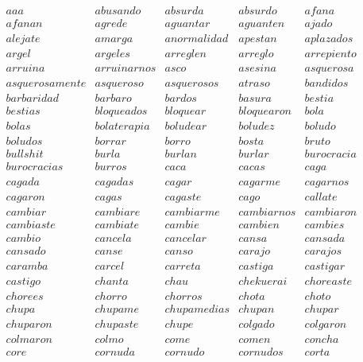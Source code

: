\noindent
$
\begin{array}{ccccc}
aaa & abusando & absurda & absurdo & afana \\
afanan & agrede & aguantar & aguanten & ajado \\
alejate & amarga & anormalidad & apestan & aplazados \\
argel & argeles & arreglen & arreglo & arrepiento \\
arruina & arruinarnos & asco & asesina & asquerosa \\
asquerosamente & asqueroso & asquerosos & atraso & bandidos \\
barbaridad & barbaro & bardos & basura & bestia \\
bestias & bloqueados & bloquear & bloquearon & bola \\
bolas & bolaterapia & boludear & boludez & boludo \\
boludos & borrar & borro & bosta & bruto \\
bullshit & burla & burlan & burlar & burocracia \\
burocracias & burros & caca & cacas & caga \\
cagada & cagadas & cagar & cagarme & cagarnos \\
cagaron & cagas & cagaste & cago & callate \\
cambiar & cambiare & cambiarme & cambiarnos & cambiaron \\
cambiaste & cambiate & cambie & cambien & cambies \\
cambio & cancela & cancelar & cansa & cansada \\
cansado & canse & canso & carajo & carajos \\
caramba & carcel & carreta & castiga & castigar \\
castigo & chanta & chau & chekuerai & choreaste \\
chorees & chorro & chorros & chota & choto \\
chupa & chupame & chupamedias & chupan & chupar \\
chuparon & chupaste & chupe & colgado & colgaron \\
colmaron & colmo & come & comen & concha \\
core & cornuda & cornudo & cornudos & corta \\
\end{array}
$

